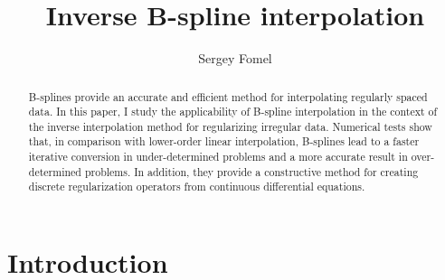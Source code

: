 


\title{Inverse B-spline interpolation}


\author{Sergey Fomel}

\maketitle

\begin{abstract}
B-splines provide an accurate and efficient method for interpolating
  regularly spaced data. In this paper, I study the applicability of
  B-spline interpolation in the context of the inverse interpolation
  method for regularizing irregular data.  Numerical tests show that,
  in comparison with lower-order linear interpolation, B-splines lead
  to a faster iterative conversion in under-determined problems and a
  more accurate result in over-determined problems. In addition, they
  provide a constructive method for creating discrete regularization
  operators from continuous differential equations.
\end{abstract}

\section{Introduction}

